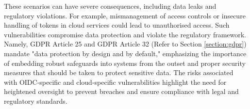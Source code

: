 These scenarios can have severe consequences, including data leaks and regulatory violations. For example, mismanagement of access controls or insecure handling of tokens in cloud services could lead to unauthorised access. Such vulnerabilities compromise data protection and violate the regulatory framework. Namely, GDPR Article 25 and GDPR Article 32 (Refer to Section \ref{section:gdpr}) mandate "data protection by design and by default," emphasizing the importance of embedding robust safeguards into systems from the outset and proper security measures that should be taken to protect sensitive data. The risks associated with OIDC-specific and cloud-specific vulnerabilities highlight the need for heightened oversight to prevent breaches and ensure compliance with legal and regulatory standards.


      